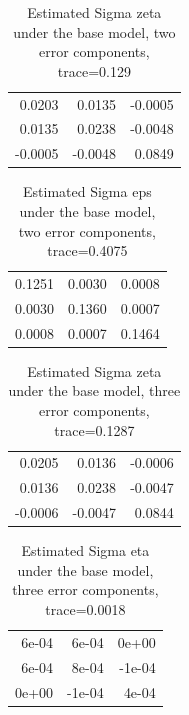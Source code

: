 \documentclass[
]{article}
\begin{document}
\begin{table}[H]

\caption{\label{tab:unnamed-chunk-32}Estimated Sigma zeta under the base model, two error components, trace=0.129}
\centering
\begin{tabular}[t]{rrr}
\toprule
0.0203 & 0.0135 & -0.0005\\
0.0135 & 0.0238 & -0.0048\\
-0.0005 & -0.0048 & 0.0849\\
\bottomrule
\end{tabular}
\end{table}

\begin{table}[H]

\caption{\label{tab:unnamed-chunk-32}Estimated Sigma eps under the base model, two error components, trace=0.4075}
\centering
\begin{tabular}[t]{rrr}
\toprule
0.1251 & 0.0030 & 0.0008\\
0.0030 & 0.1360 & 0.0007\\
0.0008 & 0.0007 & 0.1464\\
\bottomrule
\end{tabular}
\end{table}

\begin{table}[H]

\caption{\label{tab:unnamed-chunk-33}Estimated Sigma zeta under the base model, three error components, trace=0.1287}
\centering
\begin{tabular}[t]{rrr}
\toprule
0.0205 & 0.0136 & -0.0006\\
0.0136 & 0.0238 & -0.0047\\
-0.0006 & -0.0047 & 0.0844\\
\bottomrule
\end{tabular}
\end{table}

\begin{table}[H]

\caption{\label{tab:unnamed-chunk-33}Estimated Sigma eta under the base model, three error components, trace=0.0018}
\centering
\begin{tabular}[t]{rrr}
\toprule
6e-04 & 6e-04 & 0e+00\\
6e-04 & 8e-04 & -1e-04\\
0e+00 & -1e-04 & 4e-04\\
\bottomrule
\end{tabular}
\end{table}
\end{document}
